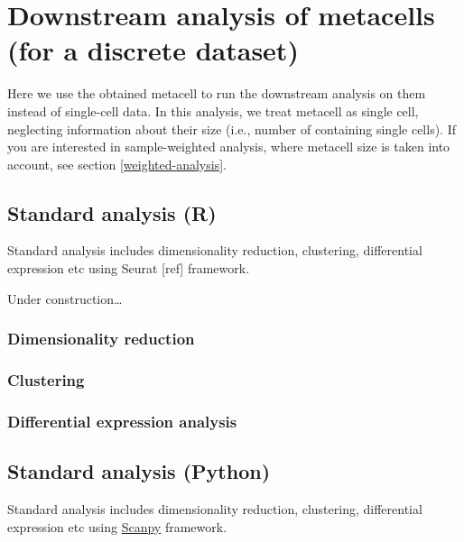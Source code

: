\documentclass[
]{book}
\begin{document}
\hypertarget{downstream-analysis-of-metacells-for-a-discrete-dataset}{%
\chapter{Downstream analysis of metacells (for a discrete dataset)}\label{downstream-analysis-of-metacells-for-a-discrete-dataset}}

Here we use the obtained metacell to run the downstream analysis on them instead of single-cell data. In this analysis, we treat metacell as single cell, neglecting information about their size (i.e., number of containing single cells). If you are interested in sample-weighted analysis, where metacell size is taken into account, see section \ref{weighted-analysis}.

\hypertarget{standard-analysis-r}{%
\section{Standard analysis (R)}\label{standard-analysis-r}}

Standard analysis includes dimensionality reduction, clustering, differential expression etc using Seurat {[}ref{]} framework.

Under construction\ldots{}

\hypertarget{dimensionality-reduction}{%
\subsection{Dimensionality reduction}\label{dimensionality-reduction}}

\hypertarget{clustering}{%
\subsection{Clustering}\label{clustering}}

\hypertarget{differential-expression-analysis}{%
\subsection{Differential expression analysis}\label{differential-expression-analysis}}

\hypertarget{standard-analysis-Py}{%
\section{Standard analysis (Python)}\label{standard-analysis-Py}}

Standard analysis includes dimensionality reduction, clustering, differential expression etc using \href{https://scanpy-tutorials.readthedocs.io/en/latest/\#}{Scanpy} framework.
\end{document}
